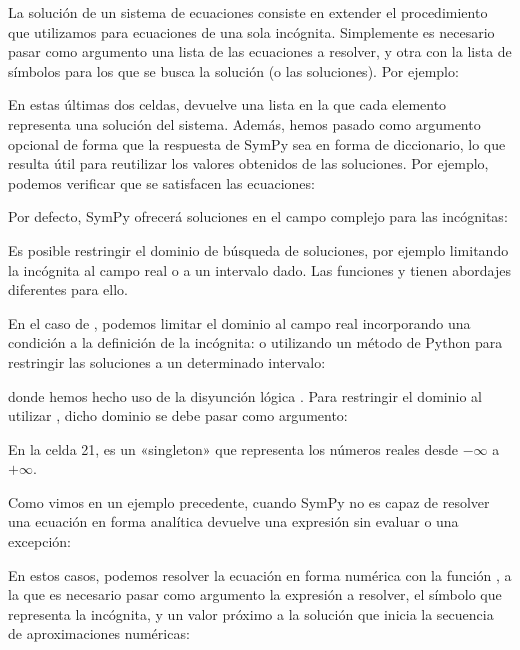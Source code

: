 La solución de un sistema de ecuaciones consiste en extender el procedimiento que utilizamos para ecuaciones de una sola incógnita. Simplemente es necesario pasar como argumento una lista de las ecuaciones a resolver, y otra con la lista de símbolos para los que se busca la solución (o las soluciones). Por ejemplo:

En estas últimas dos celdas,  devuelve una lista en la que cada elemento representa una solución del sistema. Además, hemos pasado como argumento opcional  de forma que la respuesta de SymPy sea en forma de diccionario, lo que resulta útil para reutilizar los valores obtenidos de las soluciones. Por ejemplo, podemos verificar que se satisfacen las ecuaciones:

Por defecto, SymPy ofrecerá soluciones en el campo complejo para las incógnitas:

Es posible restringir el dominio de búsqueda de soluciones, por ejemplo limitando la incógnita al campo real o a un intervalo dado. Las funciones  y  tienen abordajes diferentes para ello.

En el caso de , podemos limitar el dominio al campo real incorporando una condición a la definición de la incógnita: 
\noindent o utilizando un método de Python para restringir las soluciones a un determinado intervalo:

\noindent donde hemos hecho uso de la disyunción lógica . Para restringir el dominio al utilizar , dicho dominio se debe pasar como argumento:

En la celda 21,  es un «singleton» que representa los números reales desde $-\infty$ a $+\infty$.

Como vimos en un ejemplo precedente, cuando SymPy no es capaz de resolver una ecuación en forma analítica devuelve una expresión sin evaluar o una excepción:

En estos casos, podemos resolver la ecuación en forma numérica con la función , a la que es necesario pasar como argumento la expresión a resolver, el símbolo que representa la incógnita, y un valor próximo a la solución que inicia la secuencia de aproximaciones numéricas:

